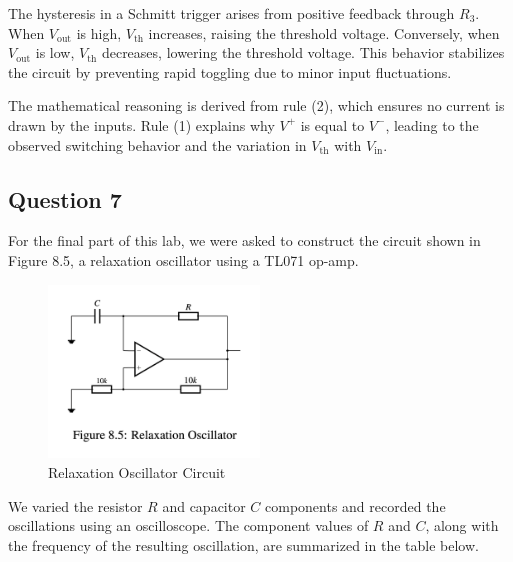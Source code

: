 \documentclass{article}
\begin{document}
The hysteresis in a Schmitt trigger arises from positive feedback through \( R_3 \). When \( V_{\text{out}} \) is high, \( V_{\text{th}} \) increases, raising the threshold voltage. Conversely, when \( V_{\text{out}} \) is low, \( V_{\text{th}} \) decreases, lowering the threshold voltage. This behavior stabilizes the circuit by preventing rapid toggling due to minor input fluctuations.

The mathematical reasoning is derived from rule (2), which ensures no current is drawn by the inputs. Rule (1) explains why \( V^+ \) is equal to \( V^- \), leading to the observed switching behavior and the variation in \( V_{\text{th}} \) with \( V_{\text{in}} \).


\subsection*{Question 7}

For the final part of this lab, we were asked to construct the circuit shown in Figure 8.5, a relaxation oscillator using a TL071 op-amp.

\begin{figure}[H]
    \centering
    \includegraphics[width=0.5\textwidth]{img/Lab 8/7_1.png} %
    \caption{Relaxation Oscillator Circuit}
\end{figure}

We varied the resistor \( R \) and capacitor \( C \) components and recorded the oscillations using an oscilloscope. The component values of \( R \) and \( C \), along with the frequency of the resulting oscillation, are summarized in the table below.
\end{document}
